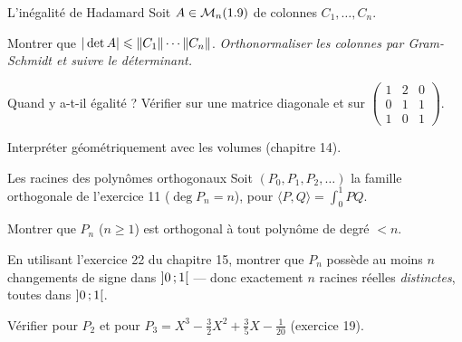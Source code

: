 \begin{exercice}[3]{L'inégalité de Hadamard}
Soit $A\in\mathcal{M}_n(1.9)$ de colonnes $C_1,\dots,C_n$.
\begin{questions}
  \item Montrer que
    $|\det A|\leqslant\left\lVert C_1\right\rVert\cdots\left\lVert C_n\right\rVert$.
    \emph{Orthonormaliser les colonnes par Gram-Schmidt et suivre le
    déterminant.}
  \item Quand y a-t-il égalité ? Vérifier sur une matrice diagonale et
    sur $\begin{pmatrix}1&2&0\\0&1&1\\1&0&1\end{pmatrix}$.
  \item Interpréter géométriquement avec les volumes (chapitre 14).
\end{questions}
\end{exercice}

\begin{exercice}[3]{Les racines des polynômes orthogonaux}
Soit $(P_0,P_1,P_2,\dots)$ la famille orthogonale de l'exercice 11
($\deg P_n=n$), pour $\langle P,Q\rangle=\int_0^1PQ$.
\begin{questions}
  \item Montrer que $P_n$ ($n\geqslant1$) est orthogonal à tout polynôme
    de degré $<n$.
  \item En utilisant l'exercice 22 du chapitre 15, montrer que $P_n$
    possède au moins $n$ changements de signe dans $\mathopen{]}0\,{;}\,1\mathclose{[}$ — donc
    exactement $n$ racines réelles \emph{distinctes}, toutes dans
    $\mathopen{]}0\,{;}\,1\mathclose{[}$.
  \item Vérifier pour $P_2$ et pour
    $P_3=X^{3}-\tfrac32X^{2}+\tfrac35X-\tfrac{1}{20}$ (exercice 19).
\end{questions}
\end{exercice}


